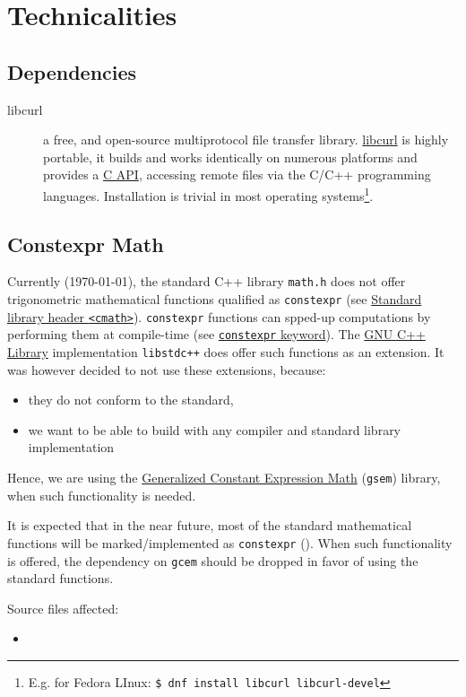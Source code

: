\chapter{Technicalities}
\label{ch:technicalities}

\section{Dependencies}
\begin{description}
    \item [libcurl] a free, and open-source multiprotocol file transfer library.
    \href{https://curl.se/libcurl/}{libcurl} is highly portable, it builds and works 
    identically on numerous platforms and provides a \href{https://curl.se/libcurl/c/}{C API}, 
    accessing remote files via the C/C++ programming languages. Installation is 
    trivial in most operating systems\footnote{E.g. for Fedora LInux: \lstinline[language=bash]|$ dnf install libcurl libcurl-devel|}.

\end{description}

\section{Constexpr Math}
Currently (\today), the standard C++ library \texttt{math.h} does not offer trigonometric mathematical 
functions qualified as \texttt{constexpr} (see \href{https://en.cppreference.com/w/cpp/header/cmath}{Standard library header \texttt{<cmath>}}).
\texttt{constexpr} functions can spped-up computations by performing them at compile-time 
(see \href{https://en.cppreference.com/w/cpp/language/constexpr}{\texttt{constexpr} keyword}). 
The \href{https://gcc.gnu.org/onlinedocs/libstdc++/}{GNU C++ Library} implementation \texttt{libstdc++} 
does offer such functions as an extension. It was however decided to not use these 
extensions, because:
\begin{itemize}
    \item they do not conform to the standard,
    \item we want to be able to build with any compiler and standard library implementation
\end{itemize}

Hence, we are using the \href{https://www.kthohr.com/gcem.html}{Generalized Constant Expression Math} 
(\texttt{gsem}) library, when such functionality is needed.

It is expected that in the near future, most of the standard mathematical functions 
will be marked/implemented as \texttt{constexpr} (\cite{rostencpp}). When such functionality is 
offered, the dependency on \texttt{gcem} should be dropped in favor of using the standard 
functions.

Source files affected:
\begin{itemize}
    \item {}
\end{itemize}
